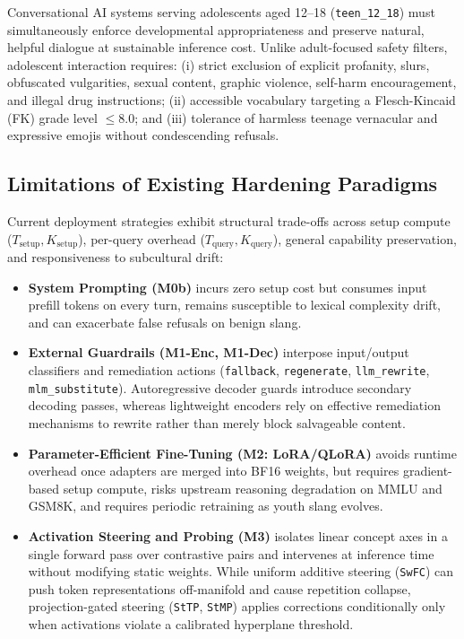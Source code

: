 \documentclass[11pt,letterpaper]{article}
\begin{document}
Conversational AI systems serving adolescents aged 12--18 (\texttt{teen\_12\_18}) must simultaneously enforce developmental appropriateness and preserve natural, helpful dialogue at sustainable inference cost. Unlike adult-focused safety filters, adolescent interaction requires: (i) strict exclusion of explicit profanity, slurs, obfuscated vulgarities, sexual content, graphic violence, self-harm encouragement, and illegal drug instructions; (ii) accessible vocabulary targeting a Flesch-Kincaid (FK) grade level $\le 8.0$; and (iii) tolerance of harmless teenage vernacular and expressive emojis without condescending refusals.

\subsection{Limitations of Existing Hardening Paradigms}
Current deployment strategies exhibit structural trade-offs across setup compute ($T_{\text{setup}}, K_{\text{setup}}$), per-query overhead ($T_{\text{query}}, K_{\text{query}}$), general capability preservation, and responsiveness to subcultural drift:
\begin{itemize}[leftmargin=1.5em]
    \item \textbf{System Prompting (M0b)} incurs zero setup cost but consumes input prefill tokens on every turn, remains susceptible to lexical complexity drift, and can exacerbate false refusals on benign slang.
    \item \textbf{External Guardrails (M1-Enc, M1-Dec)} interpose input/output classifiers and remediation actions (\texttt{fallback}, \texttt{regenerate}, \texttt{llm\_rewrite}, \texttt{mlm\_substitute}). Autoregressive decoder guards introduce secondary decoding passes, whereas lightweight encoders rely on effective remediation mechanisms to rewrite rather than merely block salvageable content.
    \item \textbf{Parameter-Efficient Fine-Tuning (M2: LoRA/QLoRA)} avoids runtime overhead once adapters are merged into BF16 weights, but requires gradient-based setup compute, risks upstream reasoning degradation on MMLU and GSM8K, and requires periodic retraining as youth slang evolves.
    \item \textbf{Activation Steering and Probing (M3)} \citep{zou2023representation,turner2023activation} isolates linear concept axes in a single forward pass over contrastive pairs and intervenes at inference time without modifying static weights. While uniform additive steering (\texttt{SwFC}) can push token representations off-manifold and cause repetition collapse, projection-gated steering (\texttt{StTP}, \texttt{StMP}) applies corrections conditionally only when activations violate a calibrated hyperplane threshold.
\end{itemize}
\end{document}
